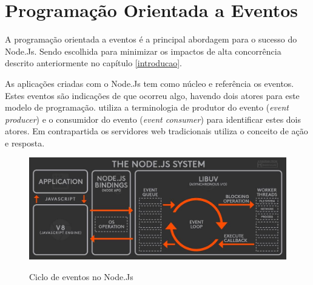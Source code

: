   
  
\section{Programação Orientada a Eventos}
\label{programacao-orientada-a-eventos}

  A programação orientada a eventos é a principal abordagem para o sucesso do Node.Js. Sendo escolhida para
  minimizar os impactos de alta concorrência descrito anteriormente no capítulo \ref{introducao}. 
  
  As aplicações criadas com o Node.Js tem como núcleo e referência os eventos. Estes eventos são indicações de que ocorreu algo, 
  havendo dois atores para este modelo de programação.\cite{Oliveira:2012}
   utiliza a terminologia de produtor do evento (\textit{event producer}) 
  e o consumidor do evento (\textit{event consumer}) para identificar estes dois atores. Em contrapartida os servidores
  web tradicionais utiliza o conceito de ação e resposta.
  
  
  \begin{figure}[H]
    \setlength{\abovecaptionskip}{0pt}
    \setlength{\belowcaptionskip}{0pt}
    \caption[Ciclo de eventos no Node.Js]{Ciclo de eventos no Node.Js}
    \centering
    \includegraphics[width=.85\textwidth]{imagem/node-js-system-twitter-BusyRich.png}
    \captionsetup{justification=centering}
    \label{fig:node-js-system-loop}
  \end{figure}
  

